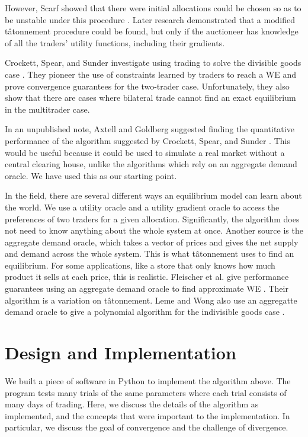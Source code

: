 \documentclass[12pt,a4paper,titlepage]{article}
\begin{document}
However, Scarf showed that there were initial allocations could be chosen so as to be unstable under this procedure \cite{scarf}.
Later research demonstrated that a modified tâtonnement procedure could be found, but only if the auctioneer has knowledge of all the traders' utility functions, including their gradients.

Crockett, Spear, and Sunder investigate using trading to solve the divisible goods case \cite{crockett}.
They pioneer the use of constraints learned by traders to reach a WE and prove convergence guarantees for the two-trader case.
Unfortunately, they also show that there are cases where bilateral trade cannot find an exact equilibrium in the multitrader case.

In an unpublished note, Axtell and Goldberg suggested finding the quantitative performance of the algorithm suggested by Crockett, Spear, and Sunder \cite{goldberg}.
This would be useful because it could be used to simulate a real market without a central clearing house, unlike the algorithms which rely on an aggregate demand oracle.
We have used this as our starting point.


In the field, there are several different ways an equilibrium model can learn about the world. 
We use a utility oracle and a utility gradient oracle to access the preferences of two traders for a given allocation.
Significantly, the algorithm does not need to know anything about the whole system at once.
Another source is the aggregate demand oracle, which takes a vector of prices and gives the net supply and demand across the whole system.
This is what tâtonnement uses to find an equilibrium.
For some applications, like a store that only knows how much product it sells at each price, this is realistic.
Fleischer et al. give performance guarantees using an aggregate demand oracle to find approximate WE \cite{fleischer}.
Their algorithm is a variation on tâtonnement.
Leme and Wong also use an aggregatte demand oracle to give a polynomial algorithm for the indivisible goods case \cite{leme}.





\section{Design and Implementation}\label{desimp}
We built a piece of software in Python to implement the algorithm above.
The program tests many trials of the same parameters where each trial consists of many days of trading.
Here, we discuss the details of the algorithm as implemented, and the concepts that were important to the implementation.
In particular, we discuss the goal of convergence and the challenge of divergence.
\end{document}
